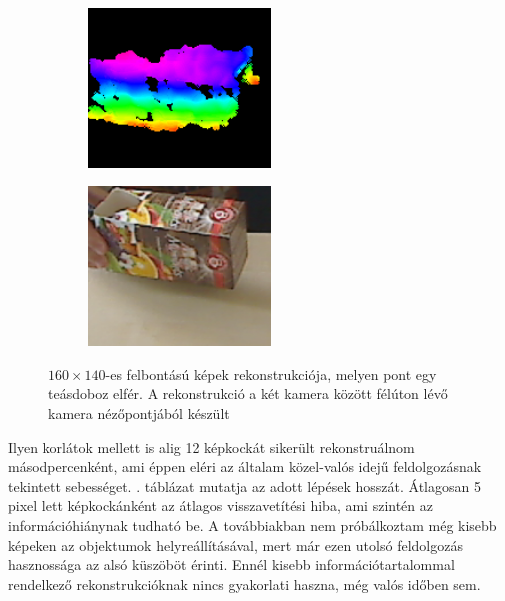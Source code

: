 \begin{figure}[tbh]
\begin{subfigure}[b]{.32\linewidth}
  \end{subfigure}
\begin{subfigure}[b]{.32\linewidth}
	\centering
	\includegraphics[width=137pt]{figures/tiny_vis_76.png}
  \end{subfigure}
\begin{subfigure}[b]{.32\linewidth}
	\centering
	\includegraphics[width=137pt]{figures/tiny_vis_76_right.png}
  \end{subfigure}
\caption{$160\times 140$-es felbontású képek rekonstrukciója, melyen pont egy teásdoboz elfér. A rekonstrukció a két kamera között félúton lévő kamera nézőpontjából készült \label{fig:cut_160_140}}
\end{figure}

Ilyen korlátok mellett is alig 12 képkockát sikerült rekonstruálnom másodpercenként, ami éppen eléri az általam közel-valós idejű feldolgozásnak tekintett sebességet. . táblázat mutatja az adott lépések hosszát. Átlagosan 5 pixel lett képkockánként az átlagos visszavetítési hiba, ami szintén az információhiánynak tudható be. A továbbiakban nem próbálkoztam még kisebb képeken az objektumok helyreállításával, mert már ezen utolsó feldolgozás hasznossága az alsó küszöböt érinti. Ennél kisebb információtartalommal rendelkező rekonstrukcióknak nincs gyakorlati haszna, még valós időben sem.

